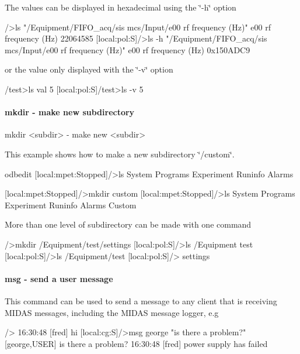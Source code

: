 The values can be displayed in hexadecimal using the \char`\"{}-\/h\char`\"{} option 
\begin{DoxyCode}
/>ls  "/Equipment/FIFO_acq/sis mcs/Input/e00 rf frequency (Hz)"
e00 rf frequency (Hz)           22064585
[local:pol:S]/>ls  -h "/Equipment/FIFO_acq/sis mcs/Input/e00 rf frequency (Hz)"
e00 rf frequency (Hz)           0x150ADC9
\end{DoxyCode}
 \par
or the value only displayed with the \char`\"{}-\/v\char`\"{} option 
\begin{DoxyCode}
/test>ls
val                             5
[local:pol:S]/test>ls -v
5
\end{DoxyCode}




\hypertarget{RC_odbedit_examples_RC_odbedit_mkdir}{}\paragraph{mkdir -\/ make new subdirectory}\label{RC_odbedit_examples_RC_odbedit_mkdir}

\begin{DoxyCode}
mkdir <subdir>          - make new <subdir>
\end{DoxyCode}
 \par
This example shows how to make a new subdirectory \char`\"{}/custom\char`\"{}. 
\begin{DoxyCode}
 odbedit
[local:mpet:Stopped]/>ls
System
Programs
Experiment
Runinfo
Alarms

[local:mpet:Stopped]/>mkdir custom
[local:mpet:Stopped]/>ls
System
Programs
Experiment
Runinfo
Alarms
Custom
\end{DoxyCode}


More than one level of subdirectory can be made with one command 
\begin{DoxyCode}
/>mkdir /Equipment/test/settings
[local:pol:S]/>ls /Equipment
test
[local:pol:S]/>ls /Equipment/test
[local:pol:S]/>
settings
\end{DoxyCode}




\hypertarget{RC_odbedit_examples_RC_odbedit_msg}{}\paragraph{msg -\/ send a user message}\label{RC_odbedit_examples_RC_odbedit_msg}
This command can be used to send a message to any client that is receiving MIDAS messages, including the MIDAS message logger, e.g 
\begin{DoxyCode}
[local:cg:S]/>
16:30:48 [fred] hi
[local:cg:S]/>msg george "is there a problem?"
[george,USER] is there a problem?
16:30:48 [fred] power supply has failed
\end{DoxyCode}



